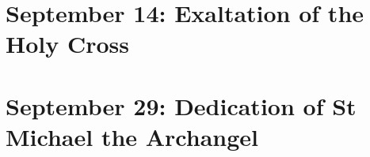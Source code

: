 {{{{    \printnote{\vesperspropersaltnote}
    \printhymn{\oldstylenums{\hymnlinetwo}}{\hymninitial}{\hymntex}{\hymntranslation}
  }
  {
    \def\vrlinebreak{T}
    \label{vr-assumption}
  }
}

\bigskip
\benedicamusdomino{}
}

{
\section{September 14: Exaltation of the Holy Cross}
\subtitle{ Class}
\subtitle{I \& II Vespers}

\def\definevesperspropers{
  \def\prepsalmfive{\greseteolcustos{manual}}
}
\def\definevesperspropersalt{}
\def\vesperspropersnote{At II Vespers:}
\def\vesperspropersaltnote{At I Vespers:}
\def\premagverses{\greseteolcustos{manual}}

\def\begincollectcols{\begin{parcolumns}[rulebetween,colwidths={1=0.42\linewidth}]{2}}
\bigskip
\benedicamusdomino{}
}

{
\section{September 29: Dedication of St Michael the Archangel}
\subtitle{ Class}
\subtitle{I \& II Vespers}

\def\definevesperspropers{
  \def\prepsalmfive{\greseteolcustos{manual}}
}
\def\definevesperspropersalt{}
\def\vesperspropersnote{At II Vespers:}
\def\vesperspropersaltnote{At I Vespers:}
\def\premagverses{\greseteolcustos{manual}}

\bigskip
\benedicamusdomino{}
}

{
}}
